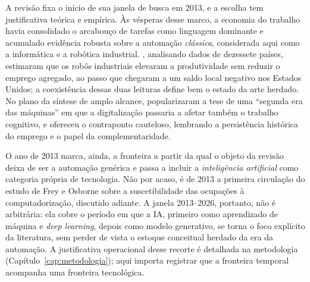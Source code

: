 
A revisão fixa o início de sua janela de busca em 2013, e a escolha tem justificativa teórica e empírica. Às vésperas desse marco, a economia do trabalho havia consolidado o arcabouço de tarefas como linguagem dominante e acumulado evidência robusta sobre a automação \emph{clássica}, considerada aqui como a informática e a robótica industrial. \textcite{graetzMichaels2018}, analisando dados de dezessete países, estimaram que os robôs industriais elevaram a produtividade sem reduzir o emprego agregado, ao passo que \textcite{acemogluRestrepo2020robots} chegaram a um saldo local negativo nos Estados Unidos; a coexistência dessas duas leituras define bem o estado da arte herdado. No plano da síntese de amplo alcance, \textcite{brynjolfssonMcafee2014} popularizaram a tese de uma ``segunda era das máquinas'' em que a digitalização passaria a afetar também o trabalho cognitivo, e \textcite{autor2015} ofereceu o contraponto cauteloso, lembrando a persistência histórica do emprego e o papel da complementaridade.

O ano de 2013 marca, ainda, a fronteira a partir da qual o objeto da revisão deixa de ser a automação genérica e passa a incluir a \emph{inteligência artificial} como categoria própria de tecnologia. Não por acaso, é de 2013 a primeira circulação do estudo de Frey e Osborne sobre a suscetibilidade das ocupações à computadorização, discutido adiante. A janela 2013--2026, portanto, não é arbitrária: ela cobre o período em que a IA, primeiro como aprendizado de máquina e \textit{deep learning}, depois como modelo generativo, se torna o foco explícito da literatura, sem perder de vista o estoque conceitual herdado da era da automação. A justificativa operacional desse recorte é detalhada na metodologia (Capítulo~\ref{cap:metodologia}); aqui importa registrar que a fronteira temporal acompanha uma fronteira tecnológica.


